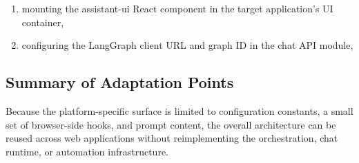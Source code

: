 \begin{enumerate}
    \item mounting the assistant-ui React component in the target application's UI container,
    \item configuring the LangGraph client URL and graph ID in the chat API module,
\end{enumerate}

\subsection{Summary of Adaptation Points}

Because the platform-specific surface is limited to configuration constants, a small set of browser-side hooks, and prompt content, the overall architecture can be reused across web applications without reimplementing the orchestration, chat runtime, or automation infrastructure.
